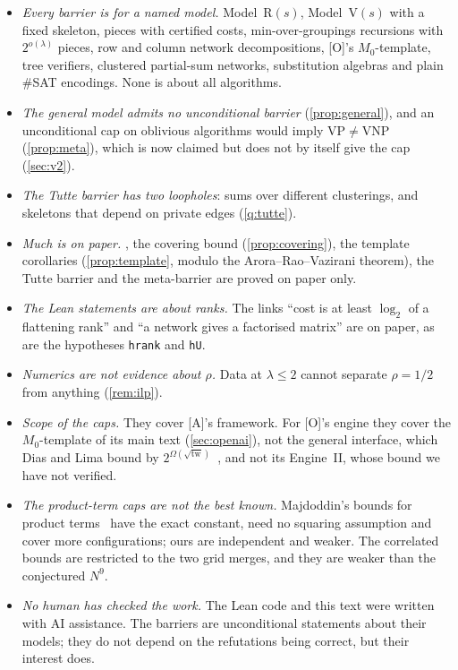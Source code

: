 \documentclass[10pt]{amsart}
\theoremstyle{plain}
\theoremstyle{definition}
\theoremstyle{remark}
\numberwithin{equation}{section}
\newcommand{\A}{\textup{[A]}}
\newcommand{\Oa}{\textup{[O]}}
\begin{document}
\begin{itemize}
\item \emph{Every barrier is for a named model.} Model~R$(s)$, Model~V$(s)$ with a fixed skeleton,
pieces with certified costs, min-over-groupings recursions with $2^{o(\lambda)}$ pieces, row and column
network decompositions, \Oa's $M_0$-template, tree verifiers, clustered partial-sum networks,
substitution algebras and plain $\#$SAT encodings. None is about all algorithms.
\item \emph{The general model admits no unconditional barrier} (\cref{prop:general}), and an
unconditional cap on oblivious algorithms would imply $\mathrm{VP}\ne\mathrm{VNP}$
(\cref{prop:meta}), which is now claimed but does not by itself give the cap (\cref{sec:v2}).
\item \emph{The Tutte barrier has two loopholes}: sums over different clusterings, and skeletons that
depend on private edges (\cref{q:tutte}).
\item \emph{Much is on paper.} , the covering bound
(\cref{prop:covering}), the template corollaries (\cref{prop:template}, modulo the
Arora--Rao--Vazirani theorem), the Tutte barrier and the meta-barrier are proved on paper only.
\item \emph{The Lean statements are about ranks.} The links ``cost is at least $\log_2$ of a flattening
rank'' and ``a network gives a factorised matrix'' are on paper, as are the hypotheses \texttt{hrank}
and \texttt{hU}.
\item \emph{Numerics are not evidence about $\rho$.} Data at $\lambda\le2$ cannot separate $\rho=1/2$ from
anything (\cref{rem:ilp}).
\item \emph{Scope of the caps.} They cover \A's framework. For \Oa's engine they cover the $M_0$-template
of its main text (\cref{sec:openai}), not the general interface, which Dias and Lima bound by
$2^{\Omega(\sqrt{\mathrm{tw}})}$~\cite{DL26}, and not its Engine~II, whose bound we have not verified.
\item \emph{The product-term caps are not the best known.} Majdoddin's bounds for product
terms~\cite{Maj26} have the exact constant, need no squaring assumption and cover more configurations;
ours are independent and weaker. The correlated bounds are restricted to the two grid merges, and
they are weaker than the conjectured $N^9$.
\item \emph{No human has checked the work.} The Lean code and this text were written with AI assistance.
The barriers are unconditional statements about their models; they do not depend on the refutations
being correct, but their interest does.
\end{itemize}
\end{document}
